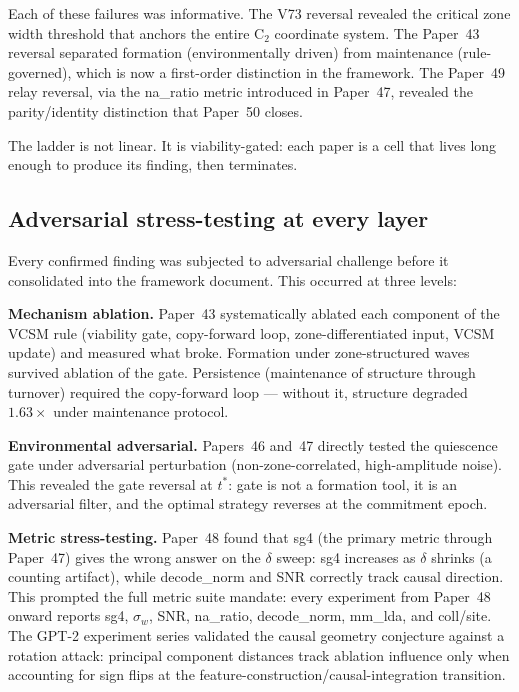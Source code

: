 \documentclass[11pt,a4paper]{article}
\begin{document}
Each of these failures was informative.
The V73 reversal revealed the critical zone width threshold that anchors the
entire C$_2$ coordinate system.
The Paper~43 reversal separated formation (environmentally driven) from
maintenance (rule-governed), which is now a first-order distinction in the framework.
The Paper~49 relay reversal, via the na\_ratio metric introduced in Paper~47,
revealed the parity/identity distinction that Paper~50 closes.

The ladder is not linear. It is viability-gated: each paper is a cell that
lives long enough to produce its finding, then terminates.

\subsection{Adversarial stress-testing at every layer}

Every confirmed finding was subjected to adversarial challenge before
it consolidated into the framework document.
This occurred at three levels:

\textbf{Mechanism ablation.}
Paper~43 systematically ablated each component of the VCSM rule
(viability gate, copy-forward loop, zone-differentiated input, VCSM update)
and measured what broke.
Formation under zone-structured waves survived ablation of the gate.
Persistence (maintenance of structure through turnover) required the
copy-forward loop --- without it, structure degraded $1.63\times$ under
maintenance protocol.

\textbf{Environmental adversarial.}
Papers~46 and~47 directly tested the quiescence gate under adversarial
perturbation (non-zone-correlated, high-amplitude noise).
This revealed the gate reversal at $t^*$: gate is not a formation tool,
it is an adversarial filter, and the optimal strategy reverses at the
commitment epoch.

\textbf{Metric stress-testing.}
Paper~48 found that sg4 (the primary metric through Paper~47) gives
the wrong answer on the $\delta$ sweep: sg4 increases as $\delta$ shrinks
(a counting artifact), while decode\_norm and SNR correctly track causal direction.
This prompted the full metric suite mandate: every experiment from Paper~48
onward reports sg4, $\sigma_w$, SNR, na\_ratio, decode\_norm, mm\_lda, and coll/site.
The GPT-2 experiment series validated the causal geometry conjecture
against a rotation attack: principal component distances track ablation influence
only when accounting for sign flips at the feature-construction/causal-integration transition.
\end{document}
